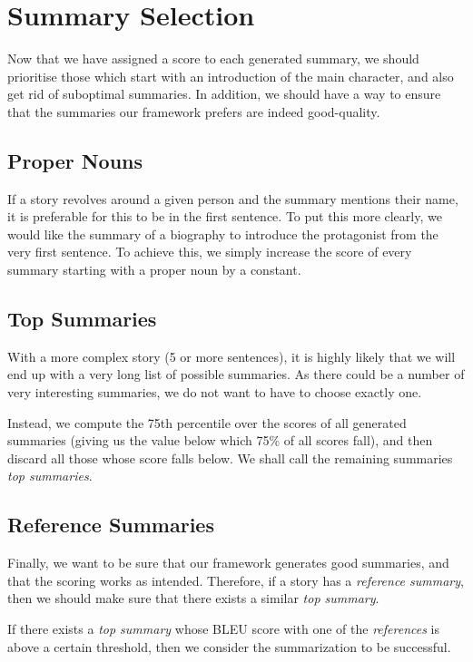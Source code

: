 \section{Summary Selection}
\label{sec:summary_selection}

Now that we have assigned a score to each generated summary, we should prioritise those which start with an introduction of the main character, and also get rid of suboptimal summaries. In addition, we should have a way to ensure that the summaries our framework prefers are indeed good-quality.

\subsection{Proper Nouns}

If a story revolves around a given person and the summary mentions their name, it is preferable for this to be in the first sentence. To put this more clearly, we would like the summary of a biography to introduce the protagonist from the very first sentence. To achieve this, we simply increase the score of every summary starting with a proper noun by a constant.

\subsection{Top Summaries}

With a more complex story (5 or more sentences), it is highly likely that we will end up with a very long list of possible summaries. As there could be a number of very interesting summaries, we do not want to have to choose exactly one.

Instead, we compute the 75th percentile over the scores of all generated summaries (giving us the value below which 75\% of all scores fall), and then discard all those whose score falls below. We shall call the remaining summaries \textit{top summaries}.

\subsection{Reference Summaries}

Finally, we want to be sure that our framework generates good summaries, and that the scoring works as intended. Therefore, if a story has a \textit{reference summary}, then we should make sure that there exists a similar \textit{top summary}.

If there exists a \textit{top summary} whose BLEU score with one of the \textit{references} is above a certain threshold, then we consider the summarization to be successful.

